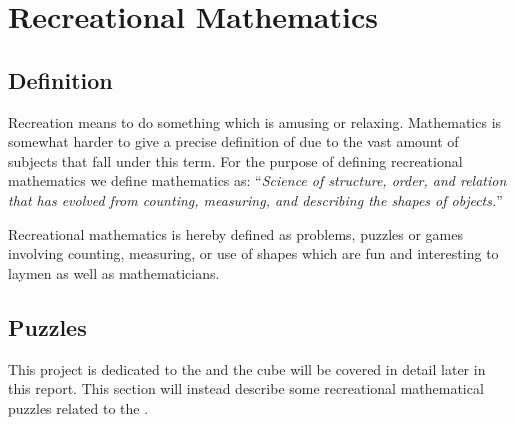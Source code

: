 \chapter{Recreational Mathematics}
\label{chap:recreationalMathematics}
\section{Definition}
Recreation means to do something which is amusing or relaxing. Mathematics is somewhat harder to give a precise definition of due to the vast amount of subjects that fall under this term.
For the purpose of defining recreational mathematics we define mathematics as:
``\emph{Science of structure, order, and relation that has evolved from counting, measuring, and describing the shapes of objects.}''\cite{mathDef2}

Recreational mathematics is hereby defined as problems, puzzles or games involving counting, measuring, or use of shapes which are fun and interesting to laymen as well as mathematicians. \cite{Singmaster98} \cite[p. 18]{Trigg78}
\section{Puzzles}
This project is dedicated to the \rubik{} and the cube will be covered in detail later in this report. This section will instead describe some recreational mathematical puzzles related to the \rubik{}.

	 
	 
	 
	
